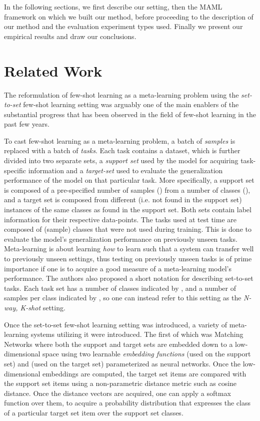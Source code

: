 \documentclass{article}
\begin{document}
In the following sections, we first describe our setting, then the MAML framework on which we built our method, before proceeding to the description of our method and the evaluation experiment types used. Finally we present our empirical results and draw our conclusions.

\section{Related Work}

The reformulation of few-shot learning as a meta-learning problem using the \emph{set-to-set} \cite{vinyals2016matching} few-shot learning setting was arguably one of the main enablers of the substantial progress that has been observed in the field of few-shot learning in the past few years. 



To cast few-shot learning as a meta-learning problem, a batch of \emph{samples} is replaced with a batch of \emph{tasks}. Each task contains a dataset, which is further divided into two separate sets, a \emph{support set} used by the model for acquiring task-specific information and a \emph{target-set} used to evaluate the generalization performance of the model on that particular task. More specifically, a support set is composed of a pre-specified number of samples () from a number of classes (), and a target set is composed from different (i.e. not found in the support set) instances of the same classes as found in the support set. Both sets contain label information for their respective data-points. The tasks used at test time are composed of (sample) classes that were not used during training. This is done to evaluate the model's generalization performance on previously unseen tasks. Meta-learning is about learning \emph{how} to learn such that a system can transfer well to previously unseen settings, thus testing on previously unseen tasks is of prime importance if one is to acquire a good measure of a meta-learning model's performance. The authors also proposed a short notation for describing set-to-set tasks. Each task set has a number of classes indicated by , and a number of samples per class indicated by , so one can instead refer to this setting as the \emph{N-way, K-shot} setting.

Once the set-to-set few-shot learning setting was introduced, a variety of meta-learning systems utilizing it were introduced. The first of which was Matching Networks \cite{vinyals2016matching} where both the support and target sets are embedded down to a low-dimensional space using two learnable \emph{embedding functions}  (used on the support set) and  (used on the target set) parameterized as neural networks. Once the low-dimensional embeddings are computed, the target set items are compared with the support set items using a non-parametric distance metric such as cosine distance. Once the distance vectors are acquired, one can apply a softmax function over them, to acquire a probability distribution that expresses the class of a particular target set item over the support set classes.  
\end{document}
